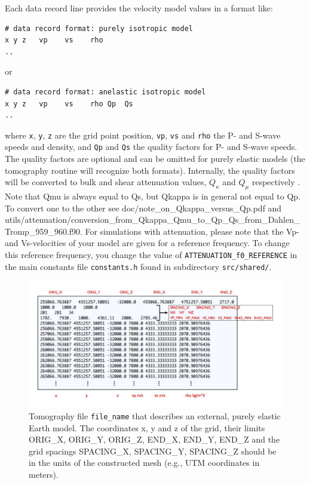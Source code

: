 \noindent
Each data record line provides the velocity model values in a format like:
{\small
\begin{verbatim}
# data record format: purely isotropic model
x y z   vp    vs    rho
..
\end{verbatim}
}
\noindent
or
{\small
\begin{verbatim}
# data record format: anelastic isotropic model
x y z   vp    vs    rho Qp  Qs
..
\end{verbatim}
}
\noindent
where  \texttt{x}, \texttt{y}, \texttt{z} are the grid point position, \texttt{vp}, \texttt{vs} and \texttt{rho} the P- and S-wave speeds and density, and \texttt{Qp} and \texttt{Qs} the quality factors for P- and S-wave speeds. The quality factors are optional and can be omitted for purely elastic models (the tomography routine will recognize both formats). Internally, the quality factors will be converted to bulk and shear attenuation values,
$Q_{\kappa}$ and $Q_{\mu}$ respectively \citep{AnHa78}.
Note that Qmu is always equal to Qs, but Qkappa is in general not equal to Qp. To convert one to the other see doc/note\_on\_Qkappa\_versus\_Qp.pdf and utils/attenuation/conversion\_from\_Qkappa\_Qmu\_to\_Qp\_Qs\_from\_Dahlen\_Tromp\_959\_960.f90.
For simulations with attenuation, please note that the Vp- and Vs-velocities of your model are given for a reference
frequency. To change this reference frequency, you change the value
of \texttt{ATTENUATION\_f0\_REFERENCE} in the main constants file
\texttt{constants.h} found in subdirectory \texttt{src/shared/}.

\begin{figure}[htbp]
\noindent \begin{centering}
\includegraphics[width=1\textwidth]{figures/tomo_file.jpg}
\par\end{centering}

\caption{Tomography file \texttt{file\_name} that describes an external, purely elastic Earth
model. The coordinates x, y and z of the grid, their limits ORIG\_X,
ORIG\_Y, ORIG\_Z, END\_X, END\_Y, END\_Z and the grid spacings SPACING\_X,
SPACING\_Y, SPACING\_Z should be in the units of the constructed mesh
(e.g., UTM coordinates in meters).}


\label{fig:tomography_file}
\end{figure}



